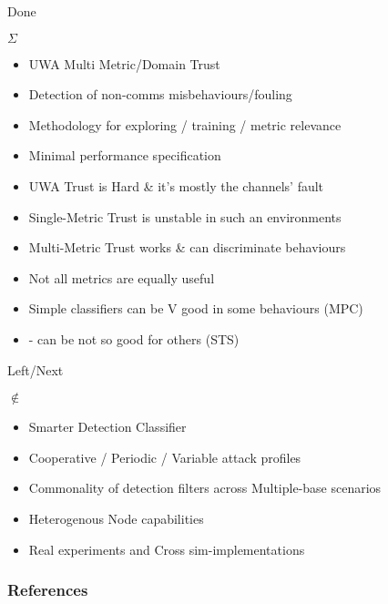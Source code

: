 \documentclass[aspectratio=169]{beamer}
\begin{document}
\begin{frame}{Done}
	\begin{block}{$\Sigma$}
		\begin{itemize}
			\item UWA Multi Metric/Domain Trust
			\item Detection of non-comms misbehaviours/fouling 
			\item Methodology for exploring / training / metric relevance
			\item Minimal performance specification
			\item UWA Trust is \alert{Hard} \& it's mostly the channels' fault
			\item Single-Metric Trust is \alert{unstable} in such an environments
			\item Multi-Metric Trust works \& can \alert{discriminate behaviours}
			\item \alert{Not all metrics} are equally useful
			\item Simple classifiers \alert{can} be V good in \alert{some} behaviours (MPC)
			\item - can be \alert{not so good} for others (STS)
		\end{itemize}
	\end{block}
\end{frame}

\begin{frame}{Left/Next}
  \begin{alertblock}{$\notin$}
    \begin{itemize}
      \item Smarter Detection Classifier
      \item Cooperative / Periodic / Variable attack profiles
      \item Commonality of detection filters across Multiple-base scenarios
      \item Heterogenous Node capabilities
      \item \alert{Real} experiments and Cross sim-implementations
    \end{itemize}
  \end{alertblock}

\end{frame}

\begin{frame}[t,allowframebreaks]
  \frametitle{References}
  \printbibliography[title=References]%
\end{frame}
\end{document}
